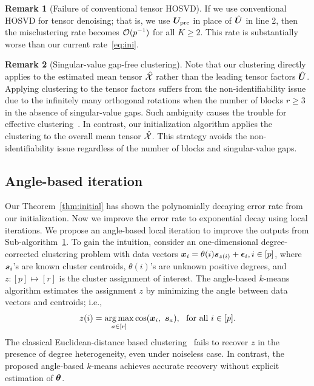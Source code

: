 \documentclass[lettersize,onecolumn,journal]{IEEEtran}
\theoremstyle{definition}
\theoremstyle{definition}
\newtheorem{rmk}{Remark}
\begin{document}
\begin{rmk}[Failure of conventional tensor HOSVD] If we use conventional HOSVD for tensor denoising; that is, we use $\bm{U}_{\text{pre}}$ in place of $\hat {\bm{U}}$ in line 2, then the misclustering rate becomes $\mathcal{O}(p^{-1})$ for all $K\geq 2$. This rate is substantially worse than our current rate~\eqref{eq:ini}.
\end{rmk}


\begin{rmk}[Singular-value gap-free clustering] Note that our clustering directly applies to the estimated mean tensor $\hat {\mathcal{X}}$ rather than the leading tensor factors $\hat {\bm{U}}$. Applying clustering to the tensor factors suffers from the non-identifiability issue due to the infinitely many orthogonal rotations when the number of blocks $r \geq 3$ in the absence of singular-value gaps. 
Such ambiguity causes the trouble for effective clustering~\citep{abbe2020entrywise}. In contrast, our initialization algorithm applies the clustering to the overall mean tensor $\hat {\mathcal{X}}$. This strategy avoids the non-identifiability issue regardless of the number of blocks and singular-value gaps.  
\end{rmk}


\subsection{Angle-based iteration}
Our Theorem~\ref{thm:initial} has shown the polynomially decaying error rate from our initialization. Now we improve the error rate to exponential decay using local iterations. We propose an angle-based local iteration to improve the outputs from Sub-algorithm~\hyperref[alg:main]{1}. 
To gain the intuition, consider an one-dimensional degree-corrected clustering problem with data vectors $\bm x_i = \theta(i) \bm{s}_{z(i)} + \boldsymbol{\epsilon}_i, i \in [p]$, where $\bm{s}_i$'s are known cluster centroids, $\theta(i)$'s are unknown positive degrees, and $z\colon [p] \mapsto [r]$ is the cluster assignment of interest. The angle-based $k$-means algorithm estimates the assignment $z$ by minimizing the angle between data vectors and centroids; i.e., 
 \begin{equation}\label{eq:angle_kmeans}
     z(i) = \argmax_{a \in [r]} \cos ( \mx_i,\ \ms_{a} ),\ \text{ for all }i \in [p].
 \end{equation}
The classical Euclidean-distance based clustering~\citep{han2020exact} fails to recover $z$ in the presence of degree heterogeneity, even under noiseless case. In contrast, the proposed angle-based $k$-means achieves accurate recovery without explicit estimation of $\boldsymbol{\theta}$. 
\end{document}
